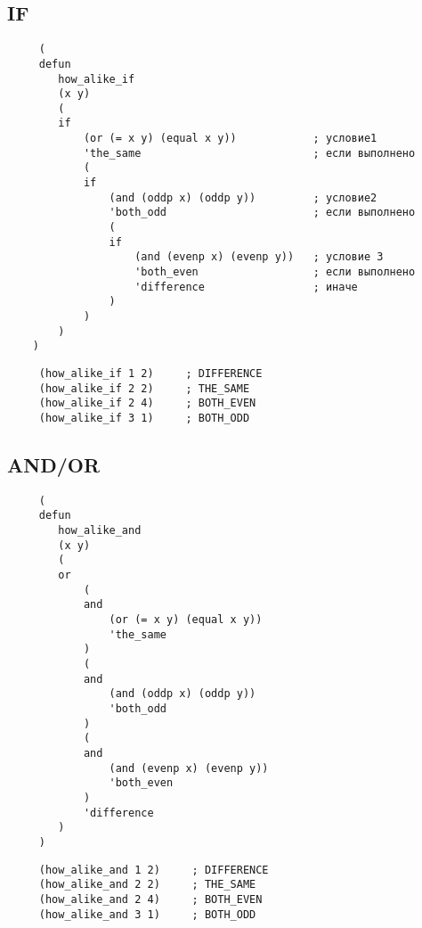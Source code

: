 \subsection*{IF}

\begin{lstlisting}
     (
     defun
        how_alike_if
        (x y)
        (
        if 
            (or (= x y) (equal x y))            ; условие1
            'the_same                           ; если выполнено
            (
            if
                (and (oddp x) (oddp y))         ; условие2
                'both_odd                       ; если выполнено
                (
                if 
                    (and (evenp x) (evenp y))   ; условие 3
                    'both_even                  ; если выполнено
                    'difference                 ; иначе
                )
            )
        )
    )
\end{lstlisting}

\begin{lstlisting}
     (how_alike_if 1 2)     ; DIFFERENCE
     (how_alike_if 2 2)     ; THE_SAME
     (how_alike_if 2 4)     ; BOTH_EVEN
     (how_alike_if 3 1)     ; BOTH_ODD
\end{lstlisting}

\newpage

\subsection*{AND/OR}

\begin{lstlisting}
     (
     defun
        how_alike_and
        (x y)
        (
        or 
            (
            and 
                (or (= x y) (equal x y))
                'the_same  
            )
            (
            and 
                (and (oddp x) (oddp y))
                'both_odd   
            )
            (
            and 
                (and (evenp x) (evenp y))
                'both_even
            )
            'difference  
        )
     )
\end{lstlisting}

\begin{lstlisting}
     (how_alike_and 1 2)     ; DIFFERENCE
     (how_alike_and 2 2)     ; THE_SAME
     (how_alike_and 2 4)     ; BOTH_EVEN
     (how_alike_and 3 1)     ; BOTH_ODD
\end{lstlisting}